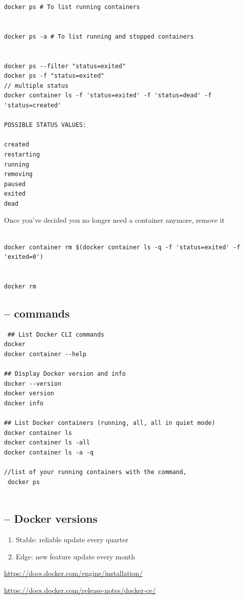 \begin{verbatim}
docker ps # To list running containers


docker ps -a # To list running and stopped containers


docker ps --filter "status=exited"
docker ps -f "status=exited"
// multiple status
docker container ls -f 'status=exited' -f 'status=dead' -f 'status=created'

POSSIBLE STATUS VALUES:

created
restarting
running
removing
paused
exited
dead

\end{verbatim}

Once you've decided you no longer need a container anymore, remove it
\begin{verbatim}

docker container rm $(docker container ls -q -f 'status=exited' -f 'exited=0')


docker rm 
\end{verbatim}

\subsection{-- commands}


\begin{verbatim}
 ## List Docker CLI commands
docker
docker container --help

## Display Docker version and info
docker --version
docker version
docker info

## List Docker containers (running, all, all in quiet mode)
docker container ls
docker container ls -all
docker container ls -a -q

//list of your running containers with the command, 
 docker ps
 
\end{verbatim}
\subsection{-- Docker versions}

\begin{enumerate}
  \item Stable: reliable update every quarter
  
  \item Edge: new feature update every month
\end{enumerate}
\url{https://docs.docker.com/engine/installation/}

\url{https://docs.docker.com/release-notes/docker-ce/}

